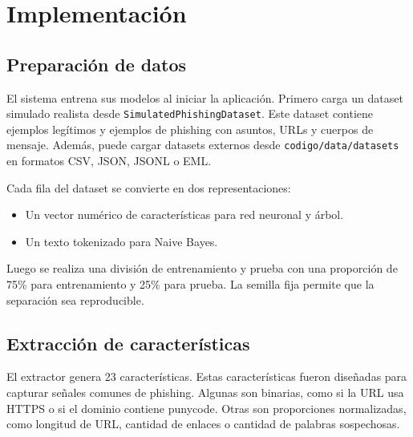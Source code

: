 \documentclass[12pt,letterpaper]{article}
\begin{document}
\section{Implementación}

\subsection{Preparación de datos}

El sistema entrena sus modelos al iniciar la aplicación. Primero carga un dataset simulado realista desde \texttt{SimulatedPhishingDataset}. Este dataset contiene ejemplos legítimos y ejemplos de phishing con asuntos, URLs y cuerpos de mensaje. Además, puede cargar datasets externos desde \texttt{codigo/data/datasets} en formatos CSV, JSON, JSONL o EML.

Cada fila del dataset se convierte en dos representaciones:

\begin{itemize}
    \item Un vector numérico de características para red neuronal y árbol.
    \item Un texto tokenizado para Naive Bayes.
\end{itemize}

Luego se realiza una división de entrenamiento y prueba con una proporción de 75\% para entrenamiento y 25\% para prueba. La semilla fija permite que la separación sea reproducible.

\subsection{Extracción de características}

El extractor genera 23 características. Estas características fueron diseñadas para capturar señales comunes de phishing. Algunas son binarias, como si la URL usa HTTPS o si el dominio contiene punycode. Otras son proporciones normalizadas, como longitud de URL, cantidad de enlaces o cantidad de palabras sospechosas.
\end{document}
